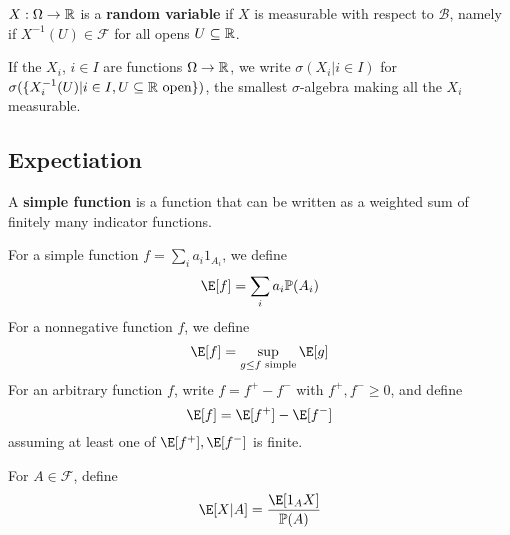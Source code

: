 \documentclass{article}
\begin{document}
\begin{defi}
  $X : \Omega \rightarrow \mathbb R$ is a {\bf random variable} if $X$ is measurable with respect to $\mathcal B$, namely if $X^{-1}(U) \in \mathcal F$ for all opens $U \subseteq \mathbb R$.
\end{defi}

If the $X_i$, $i \in I$ are functions $\Omega \rightarrow \mathbb R$, we write $\sigma(X_i | i \in I)$ for $\sigma(\{X_i^{-1}(U) | i \in I, U \subseteq \mathbb R \text{ open}\})$, the smallest $\sigma$-algebra making all the $X_i$ measurable.

\subsection{Expectiation}

\begin{defi}
  A {\bf simple function} is a function that can be written as a weighted sum of finitely many indicator functions.
\end{defi}

\begin{defi}
  For a simple function $f = \sum_i a_i 1_{A_i}$, we define
  $$\E[f] = \sum_i a_i \P(A_i)$$
  For a nonnegative function $f$, we define
  $$\E[f] = \sup_{g \le f \text{ simple}} \E[g]$$
  For an arbitrary function $f$, write $f = f^+ - f^-$ with $f^+, f^- \ge 0$, and define
  $$\E[f] = \E[f^+] - \E[f^-]$$
  assuming at least one of $\E[f^+], \E[f^-]$ is finite.
\end{defi}

\begin{defi}
  For $A \in \mathcal F$, define
  $$\E[X|A] = \frac{\E[1_A X]}{\P(A)}$$
\end{defi}

\newlec

\printindex
\end{document}
